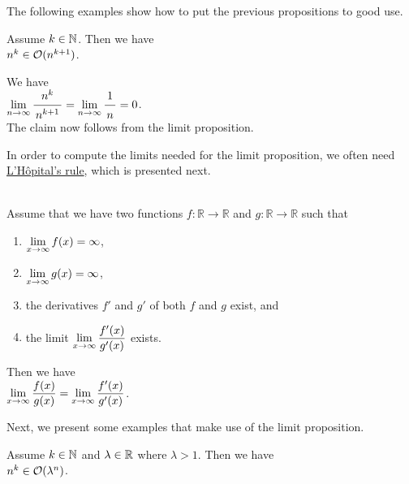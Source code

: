 \noindent
The following examples show how to put the previous propositions to good use.

\example
Assume $k \in {\mathbb N}$.  Then we have
\\[0.2cm]
\hspace*{1.3cm}
 $n^k \in \mathcal{O}(n^{k+1})$.
\ex
 
\proof
We have \\[0.2cm]
\hspace*{1.3cm} 
$\lim\limits_{n \rightarrow \infty} \bruch{n^{k}}{n^{k+1}} = \lim\limits_{n \rightarrow   \infty} \bruch{1}{n} = 0$.
\\[0.2cm]
The claim now follows from the limit proposition. 
\qeds

In order to compute the limits needed for the limit proposition, we often need
\href{https://en.wikipedia.org/wiki/L%27H%C3%B4pital%27s_rule}{L'H\^opital's rule}, which is presented next.

\begin{Theorem} \hspace*{\fill}  \\
Assume that we have two functions $f:\mathbb{R} \rightarrow \mathbb{R}$ and $g:\mathbb{R} \rightarrow \mathbb{R}$
such that
\begin{enumerate}
\item $\displaystyle \lim\limits_{x \rightarrow \infty} f(x) = \infty$,
\item $\displaystyle \lim\limits_{x \rightarrow \infty} g(x) = \infty$, 
\item the derivatives $f'$ and $g'$ of both $f$ and $g$ exist, and
\item the limit $\displaystyle \lim\limits_{x \rightarrow \infty} \frac{f'(x)}{g'(x)}$ exists.
\end{enumerate}
Then we have 
\\[0.2cm]
\hspace*{1.3cm}
$\displaystyle\lim\limits_{x \rightarrow \infty} \frac{f(x)}{g(x)} = \lim\limits_{x \rightarrow \infty}
\frac{f'(x)}{g'(x)}$. \eox
\end{Theorem}

Next, we present some examples that make use of the limit proposition.

\example
Assume $k \in {\mathbb N}$ and $\lambda \in {\mathbb R}$ where $\lambda > 1$.  Then we have \\[0.2cm]
\hspace*{1.3cm} $n^k \in \mathcal{O}(\lambda^n)$.
\ex

